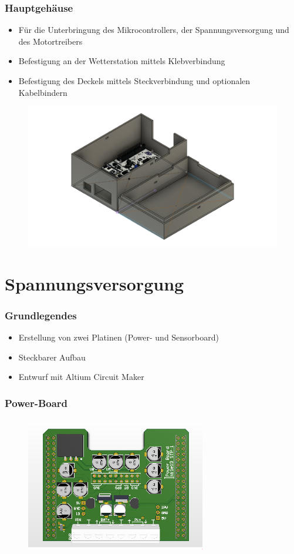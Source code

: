 \documentclass{beamer}
\begin{document}
\begin{frame}
  \frametitle{Hauptgehäuse}
  \begin{itemize}
  \item Für die Unterbringung des Mikrocontrollers, der Spannungsversorgung und des Motortreibers
  \item Befestigung an der Wetterstation mittels Klebverbindung
  \item Befestigung des Deckels mittels Steckverbindung und optionalen Kabelbindern
  \end{itemize}
  \begin{figure}[H]
    \centering
    \includegraphics[width=.7\textwidth]{./img/ST_MainBodyv13}
  \end{figure}
\end{frame}


\section{Spannungsversorgung}
\begin{frame}
\frametitle{Grundlegendes}
\begin{itemize}
\item Erstellung von zwei Platinen (Power- und Sensorboard)
\item Steckbarer Aufbau
\item Entwurf mit Altium Circuit Maker
\end{itemize}

\end{frame}
\begin{frame}
  \frametitle{Power-Board}
  \begin{figure}[H]
    \centering
    \includegraphics[width=0.7\textwidth]{./img/PCB_Power_3D_top.PNG}
  \end{figure}
\end{frame}
\end{document}
